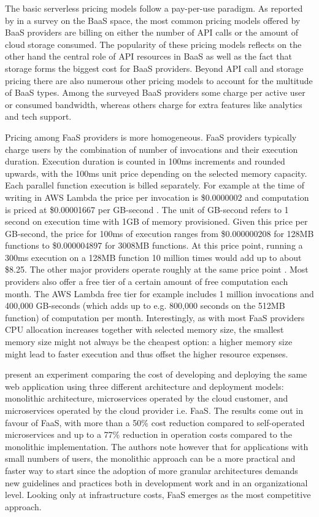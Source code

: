 The basic serverless pricing models follow a pay-per-use paradigm. As reported by \textcite{lane13baas} in a survey on the BaaS space, the most common pricing models offered by BaaS providers are billing on either the number of API calls or the amount of cloud storage consumed. The popularity of these pricing models reflects on the other hand the central role of API resources in BaaS as well as the fact that storage forms the biggest cost for BaaS providers. Beyond API call and storage pricing there are also numerous other pricing models to account for the multitude of BaaS types. Among the surveyed BaaS providers some charge per active user or consumed bandwidth, whereas others charge for extra features like analytics and tech support.

Pricing among FaaS providers is more homogeneous. FaaS providers typically charge users by the combination of number of invocations and their execution duration. Execution duration is counted in 100ms increments and rounded upwards, with the 100ms unit price depending on the selected memory capacity. Each parallel function execution is billed separately. For example at the time of writing in AWS Lambda the price per invocation is \$0.0000002 and computation is priced at \$0.00001667 per GB-second \parencite{awslambda0218}. The unit of GB-second refers to 1 second on execution time with 1GB of memory provisioned. Given this price per GB-second, the price for 100ms of execution ranges from \$0.000000208 for 128MB functions to \$0.000004897 for 3008MB functions. At this price point, running a 300ms execution on a 128MB function 10 million times would add up to about \$8.25. The other major providers operate roughly at the same price point \parencite{microsoft18azureFunctions,ibm18cloudFunctions,google18cloudFunctions}. Most providers also offer a free tier of a certain amount of free computation each month. The AWS Lambda free tier for example includes 1 million invocations and 400,000 GB-seconds (which adds up to e.g. 800,000 seconds on the 512MB function) of computation per month. Interestingly, as with most FaaS providers CPU allocation increases together with selected memory size, the smallest memory size might not always be the cheapest option: a higher memory size might lead to faster execution and thus offset the higher resource expenses.

\textcite{villamizar2017cost} present an experiment comparing the cost of developing and deploying the same web application using three different architecture and deployment models: monolithic architecture, microservices operated by the cloud customer, and microservices operated by the cloud provider i.e. FaaS. The results come out in favour of FaaS, with more than a 50\% cost reduction compared to self-operated microservices and up to a 77\% reduction in operation costs compared to the monolithic implementation. The authors note however that for applications with small numbers of users, the monolithic approach can be a more practical and faster way to start since the adoption of more granular architectures demands new guidelines and practices both in development work and in an organizational level. Looking only at infrastructure costs, FaaS emerges as the most competitive approach.

